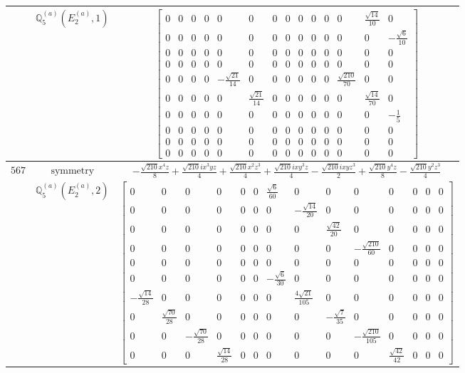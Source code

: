 \documentclass[fleqn,8pt,landscape]{jsarticle}
\begin{document}
\begin{longtable}{ccc}
$  $ & $ \mathbb{Q}_{5}^{(a)}(E_{2}^{(a)},1) $ & $ \begin{bmatrix} 0 & 0 & 0 & 0 & 0 & 0 & 0 & 0 & 0 & 0 & 0 & 0 & \frac{\sqrt{14}}{10} & 0 \\ 0 & 0 & 0 & 0 & 0 & 0 & 0 & 0 & 0 & 0 & 0 & 0 & 0 & - \frac{\sqrt{6}}{10} \\ 0 & 0 & 0 & 0 & 0 & 0 & 0 & 0 & 0 & 0 & 0 & 0 & 0 & 0 \\ 0 & 0 & 0 & 0 & 0 & 0 & 0 & 0 & 0 & 0 & 0 & 0 & 0 & 0 \\ 0 & 0 & 0 & 0 & - \frac{\sqrt{21}}{14} & 0 & 0 & 0 & 0 & 0 & 0 & \frac{\sqrt{210}}{70} & 0 & 0 \\ 0 & 0 & 0 & 0 & 0 & \frac{\sqrt{21}}{14} & 0 & 0 & 0 & 0 & 0 & 0 & \frac{\sqrt{14}}{70} & 0 \\ 0 & 0 & 0 & 0 & 0 & 0 & 0 & 0 & 0 & 0 & 0 & 0 & 0 & - \frac{1}{5} \\ 0 & 0 & 0 & 0 & 0 & 0 & 0 & 0 & 0 & 0 & 0 & 0 & 0 & 0 \\ 0 & 0 & 0 & 0 & 0 & 0 & 0 & 0 & 0 & 0 & 0 & 0 & 0 & 0 \\ 0 & 0 & 0 & 0 & 0 & 0 & 0 & 0 & 0 & 0 & 0 & 0 & 0 & 0 \end{bmatrix} $ \\ \hline
$ 567 $ & $ \text{symmetry} $ & $ - \frac{\sqrt{210} x^{4} z}{8} + \frac{\sqrt{210} i x^{3} y z}{4} + \frac{\sqrt{210} x^{2} z^{3}}{4} + \frac{\sqrt{210} i x y^{3} z}{4} - \frac{\sqrt{210} i x y z^{3}}{2} + \frac{\sqrt{210} y^{4} z}{8} - \frac{\sqrt{210} y^{2} z^{3}}{4} $ \\
$  $ & $ \mathbb{Q}_{5}^{(a)}(E_{2}^{(a)},2) $ & $ \begin{bmatrix} 0 & 0 & 0 & 0 & 0 & 0 & \frac{\sqrt{6}}{60} & 0 & 0 & 0 & 0 & 0 & 0 & 0 \\ 0 & 0 & 0 & 0 & 0 & 0 & 0 & - \frac{\sqrt{14}}{20} & 0 & 0 & 0 & 0 & 0 & 0 \\ 0 & 0 & 0 & 0 & 0 & 0 & 0 & 0 & \frac{\sqrt{42}}{20} & 0 & 0 & 0 & 0 & 0 \\ 0 & 0 & 0 & 0 & 0 & 0 & 0 & 0 & 0 & - \frac{\sqrt{210}}{60} & 0 & 0 & 0 & 0 \\ 0 & 0 & 0 & 0 & 0 & 0 & 0 & 0 & 0 & 0 & 0 & 0 & 0 & 0 \\ 0 & 0 & 0 & 0 & 0 & 0 & - \frac{\sqrt{6}}{30} & 0 & 0 & 0 & 0 & 0 & 0 & 0 \\ - \frac{\sqrt{14}}{28} & 0 & 0 & 0 & 0 & 0 & 0 & \frac{4 \sqrt{21}}{105} & 0 & 0 & 0 & 0 & 0 & 0 \\ 0 & \frac{\sqrt{70}}{28} & 0 & 0 & 0 & 0 & 0 & 0 & - \frac{\sqrt{7}}{35} & 0 & 0 & 0 & 0 & 0 \\ 0 & 0 & - \frac{\sqrt{70}}{28} & 0 & 0 & 0 & 0 & 0 & 0 & - \frac{\sqrt{210}}{105} & 0 & 0 & 0 & 0 \\ 0 & 0 & 0 & \frac{\sqrt{14}}{28} & 0 & 0 & 0 & 0 & 0 & 0 & \frac{\sqrt{42}}{42} & 0 & 0 & 0 \end{bmatrix} $ \\ \hline

\end{longtable}
\end{document}
